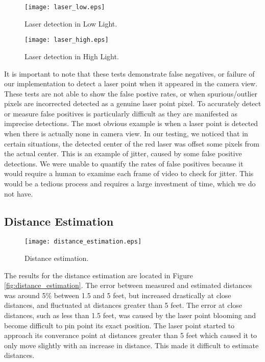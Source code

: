 \documentclass[10pt,twocolumn,letterpaper]{article}
\begin{document}
\begin{figure}[t]
\begin{center}
  \texttt{[image: laser\_low.eps]}
\end{center}
   \caption{Laser detection in Low Light.}
\label{fig:laser_low}
\label{fig:long}
\label{fig:onecol}
\end{figure}

\begin{figure}[t]
\begin{center}
  \texttt{[image: laser\_high.eps]}
\end{center}
   \caption{Laser detection in High Light.}
\label{fig:laser_high}
\label{fig:long}
\label{fig:onecol}
\end{figure}

It is important to note that these tests demonstrate false negatives, or failure of our implementation to detect a laser point when it appeared in the camera view.  These tests are not able to show the false postive rates, or when spurious/outlier pixels are incorrected detected as a genuine laser point pixel.  To accurately detect or measure false positives is particularly difficult as they are manifested as imprecise detections.  The most obvious example is when a laser point is detected when there is actually none in camera view.  In our testing, we noticed that in certain situations, the detected center of the red laser was offset some pixels from the actual center.  This is an example of jitter, caused by some false positive detections.  We were unable to quantify the rates of false positives because it would require a human to examime each frame of video to check for jitter.  This would be a tedious process and requires a large investment of time, which we do not have.

\subsection{Distance Estimation}

\begin{figure}[t]
\begin{center}
  \texttt{[image: distance\_estimation.eps]}
\end{center}
   \caption{Distance estimation.}
\label{fig:distance_estimation}
\label{fig:long}
\label{fig:onecol}
\end{figure}

The results for the distance estimation are located in Figure \ref{fig:distance_estimation}. The error between measured and estimated distances was around 5\% between 1.5 and 5 feet, but increased drastically at close distances, and fluctuated at distances greater than 5 feet. The error at close distances, such as less than 1.5 feet, was caused by the laser point blooming and become difficult to pin point its exact position. The laser point started to approach its converance point at distances greater than 5 feet which caused it to only move slightly with an increase in distance. This made it difficult to estimate distances.
\end{document}
